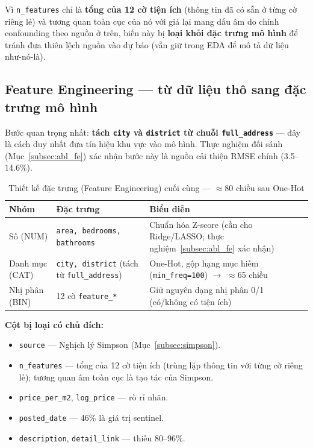 Vì \texttt{n\_features} chỉ là \textbf{tổng của 12 cờ tiện ích} (thông tin đã có sẵn ở
từng cờ riêng lẻ) và tương quan toàn cục của nó với giá lại mang dấu âm do chính
confounding theo nguồn ở trên, biến này bị \textbf{loại khỏi đặc trưng mô hình}
để tránh đưa thiên lệch nguồn vào dự báo (vẫn giữ trong EDA để mô tả dữ liệu như-nó-là).

\subsection{Feature Engineering — từ dữ liệu thô sang đặc trưng mô hình}
\label{subsec:fe}

Bước quan trọng nhất: \textbf{tách \texttt{city} và \texttt{district} từ chuỗi
\texttt{full\_address}} — đây là cách duy nhất đưa tín hiệu khu vực vào mô hình.
Thực nghiệm đối sánh (Mục~\ref{subsec:abl_fe}) xác nhận bước này là nguồn cải thiện
RMSE chính (3.5--14.6\%).

\begin{table}[H]
  \centering
  \caption{Thiết kế đặc trưng (Feature Engineering) cuối cùng — $\approx$80 chiều sau One-Hot}
  \label{tab:features}
  \begin{tabularx}{\textwidth}{@{}l X X@{}}
    \toprule
    \textbf{Nhóm} & \textbf{Đặc trưng} & \textbf{Biểu diễn} \\
    \midrule
    Số (NUM) &
      \texttt{area, bedrooms, bathrooms} &
      Chuẩn hóa Z-score
      (cần cho Ridge/LASSO; thực nghiệm~\ref{subsec:abl_fe} xác nhận) \\
    Danh mục (CAT) &
      \texttt{city, district} (tách từ \texttt{full\_address}) &
      One-Hot, gộp hạng mục hiếm (\texttt{min\_freq=100})
      $\to$ $\approx$65 chiều \\
    Nhị phân (BIN) &
      12 cờ \texttt{feature\_*} &
      Giữ nguyên dạng nhị phân 0/1 (có/không có tiện ích) \\
    \bottomrule
  \end{tabularx}
\end{table}

\textbf{Cột bị loại có chủ đích:}
\begin{itemize}[leftmargin=*, itemsep=2pt]
  \item \texttt{source} — Nghịch lý Simpson (Mục~\ref{subsec:simpson}).
  \item \texttt{n\_features} — tổng của 12 cờ tiện ích (trùng lặp thông tin với
        từng cờ riêng lẻ); tương quan âm toàn cục là tạo tác của Simpson.
  \item \texttt{price\_per\_m2}, \texttt{log\_price} — rò rỉ nhãn.
  \item \texttt{posted\_date} — 46\% là giá trị sentinel.
  \item \texttt{description}, \texttt{detail\_link} — thiếu 80--96\%.
\end{itemize}

